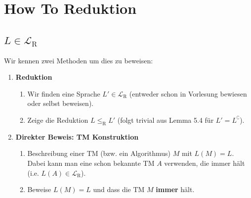 \documentclass[a4paper, 11pt]{article}
\def\L{\mathcal{L}}
\def\Lr{\mathcal{L}_\text{R}}
\begin{document}
                \section{How To Reduktion}
                
                    \subsection{$L \in \Lr$ }
                        Wir kennen zwei Methoden um dies zu beweisen:
                        \begin{enumerate}[label=\Roman*.]
                            \item \textbf{Reduktion}
                            \begin{enumerate}[label = (\alph*)]
                                \item Wir finden eine Sprache $L' \in \L_\text{R}$ (entweder schon in Vorlesung bewiesen oder selbst beweisen).
                                \item  Zeige die Reduktion $L \leq_{\text{R}} L'$ (folgt trivial aus Lemma 5.4 für $L' = L^\complement$).
                            \end{enumerate}
                                \item \textbf{Direkter Beweis: TM Konstruktion}
                                \begin{enumerate}[label=(\alph*)]
                                    \item Beschreibung einer TM (bzw. ein Algorithmus) $M$ mit $L(M) = L$. Dabei kann man eine schon bekannte TM $A$ verwenden, die immer hält (i.e. $L(A) \in \Lr$).
                                    \item Beweise $L(M) = L$ und dass die TM $M$ \textbf{immer} hält.
                                \end{enumerate}
                        \end{enumerate}
                
                
                
\end{document}
